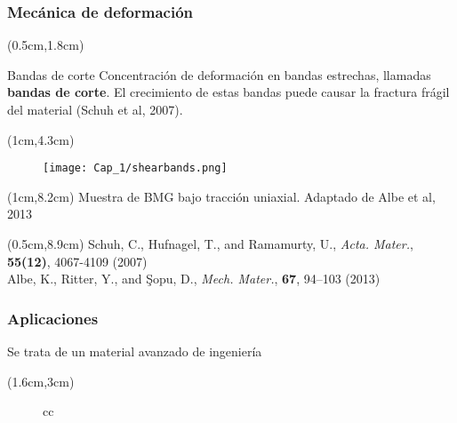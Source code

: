 \begin{frame}
 \frametitle{Mec\'anica de deformaci\'on}
 \begin{textblock*}{11.8cm}(0.5cm,1.8cm)
  \begin{block}{Bandas de corte}
  Concentraci\'on de deformaci\'on en bandas estrechas, llamadas \textbf{bandas de corte}.
  El crecimiento de estas bandas puede causar la fractura fr\'agil del material (Schuh et al, 2007).
  \end{block}
 \end{textblock*}
 \vspace{-0.7cm}
 \begin{textblock*}{\textwidth}(1cm,4.3cm)
  \begin{figure}
  \centering
  \texttt{[image: Cap\_1/shearbands.png]}
  \end{figure}
 \end{textblock*}
\begin{textblock*}{\textwidth}(1cm,8.2cm)
 \centering
 \scriptsize{Muestra de BMG bajo tracci\'on uniaxial. Adaptado de Albe et al, 2013}
\end{textblock*}

 \begin{textblock*}{12.6cm}(0.5cm,8.9cm)
 \scriptsize{Schuh, C., Hufnagel, T., and Ramamurty, U., \textit{Acta. Mater.}, \textbf{55(12)}, 4067-4109 (2007)} \\
 \scriptsize{Albe, K., Ritter, Y., and Şopu, D., \textit{Mech. Mater.}, \textbf{67}, 94–103 (2013)}
 \end{textblock*}

\end{frame}

\begin{frame}
 \frametitle{Aplicaciones}
 \centering
 Se trata de un material avanzado de ingenier\'ia
 
 \begin{textblock*}{12.6cm}(1.6cm,3cm)
  \begin{figure}
  \centering
  \begin{tabularx}{\textwidth}{cc}
  \end{tabularx}
  \end{figure}
 \end{textblock*}
\end{frame}

